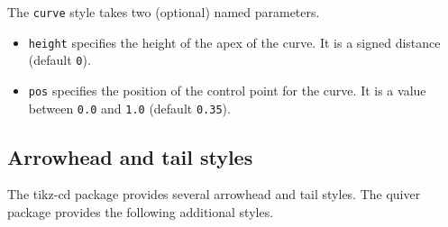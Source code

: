 \documentclass[12pt,a4paper]{article}
\newcommand{\quiver}{\textsf{quiver}}
\newcommand{\tcd}{\textsf{tikz-cd}}
\begin{document}
The \texttt{curve} style takes two (optional) named parameters.

\begin{itemize}
    \item \texttt{height} specifies the height of the apex of the curve. It is a signed distance (default \texttt{0}).
    \item \texttt{pos} specifies the position of the control point for the curve. It is a value between \texttt{0.0} and \texttt{1.0} (default \texttt{0.35}).
\end{itemize}

\begin{tikzexample}
\end{tikzexample}

\begin{tikzexample}
\end{tikzexample}

\begin{tikzexample}
\end{tikzexample}

\subsection{Arrowhead and tail styles}

The \tcd{} package provides several arrowhead and tail styles. The \quiver{} package provides the following additional styles.
\end{document}
